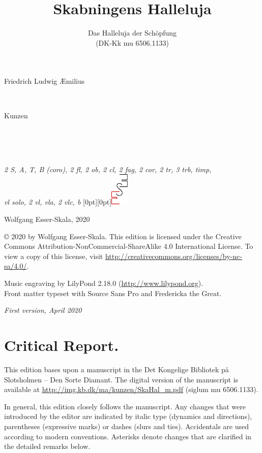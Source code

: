 \documentclass[parskip=full]{scrreprt}
\makeatletter
\DeclareRobustCommand{\sbseries}{\fontseries{sb}\selectfont}
\newcommand\fancytitlehead{
	\headingfont%
	\fontsize{80}{80}\selectfont\textcolor{black!80}{\@lastname.}\\[15pt]%
	\fontsize{60}{60}\selectfont\@ifundefined{@shorttitle}{\@title}{\@shorttitle}.%
}
\def\firstname#1{\def\@firstname{#1}}
\def\lastname#1{\def\@lastname{#1}}
\def\shorttitle#1{\def\@shorttitle{#1}}
\def\instrumentation#1{\def\@instrumentation{#1}}
\def\maketitle{%
\begin{titlepage}%
	\Large%
	{\@titlehead}%
	\vfill%
	{\strut\@firstname}\\%
	{\sbseries\color{oldred}\strut\@lastname}\\%
	{\strut\@namesuffix}%
	\vfill%
	{\sbseries\@title}\\%
	{\@subtitle}\\[\baselineskip]%
	{\itshape\@instrumentation}%
	\vfill%
	{\itshape\@parts}\hspace*{\fill}\raisebox{0pt}[0pt][0pt]{\includegraphics{ees_logo}}%
\end{titlepage}%
}
\newif\ifprintreport\printreportfalse
\makeatother
\begin{document}
\titlehead{\fancytitlehead}
\firstname{Friedrich Ludwig Æmilius} %
\lastname{Kunzen}
\title{Skabningens Halleluja}
\shorttitle{Skabningens\\Halleluja}
\subtitle{Das Halleluja der Schöpfung\\(DK-Kk mu 6506.1133)}
\instrumentation{2 S, A, T, B (coro), 2 fl, 2 ob, 2 cl, 2 fag, 2 cor, 2 tr, 3 trb, timp,\\vl solo, 2 vl, vla, 2 vlc, b}
\maketitle


\thispagestyle{empty}

\vspace*{\fill}

\hspace*{1em}Wolfgang Esser-Skala, 2020

© 2020 by Wolfgang Esser-Skala. This edition is licensed under the Creative Commons Attribution-NonCommercial-ShareAlike 4.0 International License. To view a copy of this license, visit \url{http://creativecommons.org/licenses/by-nc-sa/4.0/}. 

Music engraving by LilyPond 2.18.0 (\url{http://www.lilypond.org}).\\
Front matter typeset with Source Sans Pro and Fredericka the Great.

\textit{First version, April 2020}

\vspace*{2cm}

\ifprintreport
\chapter*{Critical Report.}

This edition bases upon a manuscript in the Det Kongelige Bibliotek på Slotsholmen – Den Sorte Diamant. The digital version of the manuscript is available at \url{http://img.kb.dk/ma/kunzen/SkaHal_m.pdf} (siglum mu 6506.1133).

In general, this edition closely follows the manuscript. Any changes that were introduced by the editor are indicated by italic type (dynamics and directions), parentheses (expressive marks) or dashes (slurs and ties). Accidentals are used according to modern conventions. Asterisks denote changes that are clarified in the detailed remarks below.
\end{document}
